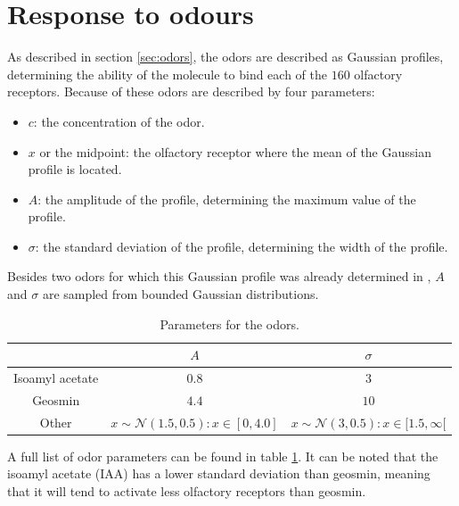 \section{Response to odours}
As described in section \ref{sec:odors}, the odors are described as Gaussian profiles, determining the ability of the molecule to bind each of the $160$ olfactory receptors.
Because of these odors are described by four parameters:

\begin{itemize}
  \item $c$: the concentration of the odor.
  \item $x$ or the midpoint: the olfactory receptor where the mean of the Gaussian profile is located.
  \item $A$: the amplitude of the profile, determining the maximum value of the profile.
  \item $\sigma$: the standard deviation of the profile, determining the width of the profile.
\end{itemize}

Besides two odors for which this Gaussian profile was already determined in \cite{data-driven-antennal-lobe-model}, $A$ and $\sigma$ are sampled from bounded Gaussian distributions.

\begin{table}
  \centering
  \begin{tabular}{ c c c }
    \hline
    & $A$ & $\sigma$ \\
    \hline
    Isoamyl acetate & $0.8$ & $3$\\
    Geosmin & $4.4$ & $10$\\
    Other & $x\sim\mathcal{N}(1.5,0.5): x \in [0, 4.0]$ & $x\sim\mathcal{N}(3,0.5): x \in [1.5, \infty[$\\
    \hline
  \end{tabular}
  \caption{Parameters for the odors.}
  \label{tab:odors}
\end{table}

A full list of odor parameters can be found in table \ref{tab:odors}.
It can be noted that the isoamyl acetate (IAA) has a lower standard deviation than geosmin, meaning that it will tend to activate less olfactory receptors than geosmin.\\

